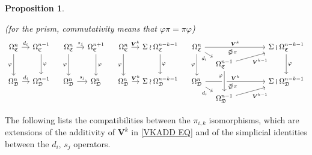 \documentclass[a4paper,10pt
]{article}%
\numberwithin{equation}{section}
\numberwithin{figure}{section}
\newtheorem{proposition}[equation]{Proposition}%
\theoremstyle{definition} %
\newcommand{\1}{\ensuremath{\mathbbm 1}}%
\begin{document}
\begin{proposition}
\begin{enumerate}[label = (\roman*)]
		(for the prism, commutativity means that
		$\varphi \pi = \pi \varphi$)
		\[
		\begin{tikzcd}[column sep = 10pt, row sep = 4pt]
		\Omega^n_{\mathfrak{C}} \ar{r}{d_i} \ar{dd}[swap]{\varphi} &
		\Omega^{n-1}_{\mathfrak{C}} \ar{dd}{\varphi}
		&
		\Omega^n_{\mathfrak{C}} \ar{r}{s_j} \ar{dd}[swap]{\varphi} &
		\Omega^{n+1}_{\mathfrak{C}} \ar{dd}{\varphi}
		&
		\Omega^n_{\mathfrak{C}} \ar{r}{\boldsymbol{V}^k} \ar{dd}[swap]{\varphi} &
		\Sigma \wr \Omega^{n-k-1}_{\mathfrak{C}} \ar{dd}{\varphi}
		&
		\Omega^n_{\mathfrak{C}}
		\ar{rrrrr}[name=toE]{\boldsymbol{V}^k} \ar{rd}[swap]{d_i} \ar{dd}[swap]{\varphi}
		&&&
		&&
		\Sigma \wr \Omega^{n-k-1}_{\mathfrak{C}} \ar{dd}{\varphi}
		\\
		&
		&
		&
		&
		&
		&
		&
		|[alias=DBE]|
		\Omega^{n-1}_{\mathfrak{C}} \ar{rrrru}[swap]{\boldsymbol{V}^{k-1}}
		\\
		\Omega^n_{\mathfrak{D}} \ar{r}{d_i} &
		\Omega^{n-1}_{\mathfrak{D}}
		&
		\Omega^n_{\mathfrak{D}} \ar{r}{s_j} &
		\Omega^n_{\mathfrak{D}}
		&
		\Omega^n_{\mathfrak{D}} \ar{r}{\boldsymbol{V}^k} &
		\Sigma \wr \Omega^{n-k-1}_{\mathfrak{D}}
		&
		\Omega^n_{\mathfrak{D}} \ar{rrrrr}[name=toB]{\boldsymbol{V}^k} \ar{rd}[swap]{d_i}
		&&&
		&&
		\Sigma \wr \Omega^{n-k-1}_{\mathfrak{D}}
		\\
		&
		&
		&
		&
		&
		&
		&
		|[alias=D]| \Omega^{n-1}_{\mathfrak{D}} \ar{rrrru}[swap]{\boldsymbol{V}^{k-1}}
		\arrow[Leftrightarrow, from=DBE, to=toE, shorten <=0.1cm,shorten >=0.1cm
		,swap,near end,"\pi"
		]
		\arrow[Leftrightarrow, from=D, to=toB, shorten <=0.1cm,shorten >=0.1cm,swap,near end,"\pi"]
		\arrow[from=DBE, to=D, crossing over, near start, swap, "\varphi"]
		\end{tikzcd}
		\]
	\end{enumerate}
\end{proposition}


The following lists the compatibilities between the $\pi_{i,k}$ isomorphisms, 
which are extensions of the additivity of $\boldsymbol{V}^k$ in \eqref{VKADD EQ} and of the simplicial identities between the $d_i$, $s_j$ operators.
\end{document}
